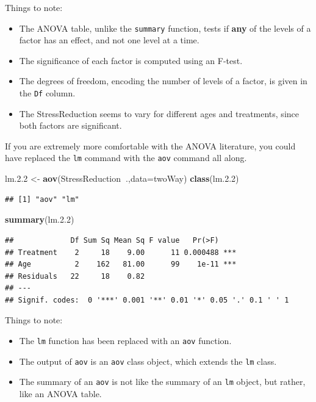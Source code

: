 \documentclass[]{book}
\newenvironment{Shaded}{\begin{snugshade}}{\end{snugshade}}
\newcommand{\KeywordTok}[1]{\textcolor[rgb]{0.13,0.29,0.53}{\textbf{#1}}}
\newcommand{\DataTypeTok}[1]{\textcolor[rgb]{0.13,0.29,0.53}{#1}}
\newcommand{\FloatTok}[1]{\textcolor[rgb]{0.00,0.00,0.81}{#1}}
\newcommand{\StringTok}[1]{\textcolor[rgb]{0.31,0.60,0.02}{#1}}
\newcommand{\OperatorTok}[1]{\textcolor[rgb]{0.81,0.36,0.00}{\textbf{#1}}}
\newcommand{\NormalTok}[1]{#1}
\providecommand{\tightlist}{%
  \setlength{\itemsep}{0pt}\setlength{\parskip}{0pt}}
\theoremstyle{definition}
\theoremstyle{definition}
\theoremstyle{definition}
\theoremstyle{remark}
\begin{document}
Things to note:

\begin{itemize}
\tightlist
\item
  The ANOVA table, unlike the \texttt{summary} function, tests if
  \textbf{any} of the levels of a factor has an effect, and not one
  level at a time.
\item
  The significance of each factor is computed using an F-test.
\item
  The degrees of freedom, encoding the number of levels of a factor, is
  given in the \texttt{Df} column.
\item
  The StressReduction seems to vary for different ages and treatments,
  since both factors are significant.
\end{itemize}

If you are extremely more comfortable with the ANOVA literature, you
could have replaced the \texttt{lm} command with the \texttt{aov}
command all along.

\begin{Shaded}
\begin{Highlighting}[]
\NormalTok{lm.}\FloatTok{2.2}\NormalTok{ <-}\StringTok{ }\KeywordTok{aov}\NormalTok{(StressReduction}\OperatorTok{~}\NormalTok{.,}\DataTypeTok{data=}\NormalTok{twoWay)}
\KeywordTok{class}\NormalTok{(lm.}\FloatTok{2.2}\NormalTok{)}
\end{Highlighting}
\end{Shaded}

\begin{verbatim}
## [1] "aov" "lm"
\end{verbatim}

\begin{Shaded}
\begin{Highlighting}[]
\KeywordTok{summary}\NormalTok{(lm.}\FloatTok{2.2}\NormalTok{)}
\end{Highlighting}
\end{Shaded}

\begin{verbatim}
##             Df Sum Sq Mean Sq F value   Pr(>F)    
## Treatment    2     18    9.00      11 0.000488 ***
## Age          2    162   81.00      99    1e-11 ***
## Residuals   22     18    0.82                     
## ---
## Signif. codes:  0 '***' 0.001 '**' 0.01 '*' 0.05 '.' 0.1 ' ' 1
\end{verbatim}

Things to note:

\begin{itemize}
\tightlist
\item
  The \texttt{lm} function has been replaced with an \texttt{aov}
  function.
\item
  The output of \texttt{aov} is an \texttt{aov} class object, which
  extends the \texttt{lm} class.
\item
  The summary of an \texttt{aov} is not like the summary of an
  \texttt{lm} object, but rather, like an ANOVA table.
\end{itemize}
\end{document}
